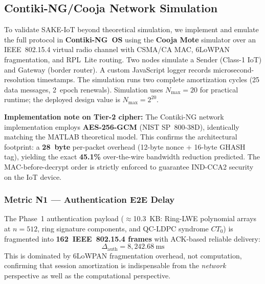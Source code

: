 \documentclass[conference]{IEEEtran}
\newcommand{\Nmax}{N_{\max}}
\begin{document}
\subsection{Contiki-NG/Cooja Network Simulation}
\label{sec:cooja}

To validate SAKE-IoT beyond theoretical simulation, we implement and
emulate the full protocol in \textbf{Contiki-NG~OS} using the
\textbf{Cooja Mote} simulator over an IEEE~802.15.4 virtual radio
channel with CSMA/CA MAC, 6LoWPAN fragmentation, and RPL~Lite routing.
Two nodes simulate a Sender (Class-1 IoT) and Gateway (border router).
A custom JavaScript logger records microsecond-resolution timestamps. The
simulation runs two complete amortization cycles (25 data messages,
2~epoch renewals). Simulation uses $\Nmax{=}20$ for practical runtime;
the deployed design value is $\Nmax{=}2^{20}$.

\noindent\textbf{Implementation note on Tier-2 cipher:} The Contiki-NG
network implementation employs \textbf{AES-256-GCM} (NIST SP~800-38D), 
identically matching the MATLAB theoretical model. This confirms the 
architectural footprint: a \textbf{28~byte} per-packet overhead (12-byte 
nonce + 16-byte GHASH tag), yielding the exact \textbf{45.1\%} over-the-wire
bandwidth reduction predicted. The MAC-before-decrypt order is strictly
enforced to guarantee IND-CCA2 security on the IoT device.

\subsubsection*{Metric N1 --- Authentication E2E Delay}

The Phase~1 authentication payload ($\approx$10.3~KB: Ring-LWE
polynomial arrays at $n{=}512$, ring signature components, and
QC-LDPC syndrome $CT_0$) is fragmented into \textbf{162~IEEE~802.15.4
frames} with ACK-based reliable delivery:
\begin{equation}
\Delta_{\text{auth}} = 8{,}242.68~\text{ms}
\label{eq:authdelay}
\end{equation}
This is dominated by 6LoWPAN fragmentation overhead, not computation,
confirming that session amortization is indispensable from the
\emph{network} perspective as well as the computational perspective.
\end{document}
